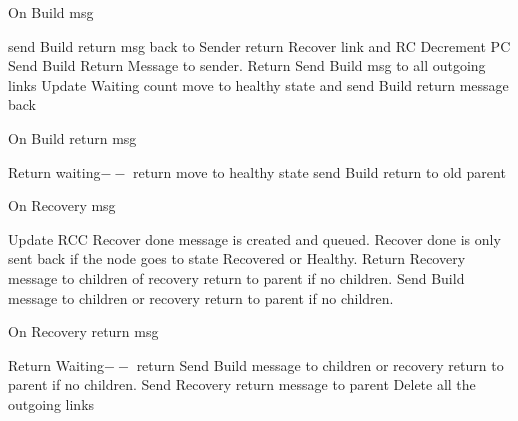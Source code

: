 \documentclass{article}
\begin{document}
	
\begin{algorithm}
\caption{On Build msg}
\label{Build message received}
\begin{algorithmic}[1]
\State send Build return msg back to Sender
\State return
\EndIf
\State Recover link and RC
\State Decrement PC
\State Send Build Return Message to sender.
\State Return
\EndIf
\State Send Build msg to all outgoing links
\State Update Waiting count
\State move to healthy state and send Build return message back
\EndIf
\EndProcedure
\end{algorithmic}
\end{algorithm}	



\begin{algorithm}
\caption{On Build return msg}
\label{Build return message received}
\begin{algorithmic}[1]
\State Return
\EndIf
\State waiting$--$
\State return
\EndIf
\State move to healthy state
\State send Build return to old parent
\EndIf
\EndProcedure
\end{algorithmic}
\end{algorithm}	


\begin{algorithm}
\caption{On Recovery msg}
\label{Recovery message received}
\begin{algorithmic}[1]
\State Update RCC
\State Recover done message is created and queued.
\State Recover done is only sent back if the node goes to state Recovered or Healthy.
\State Return
\EndIf
{}
\State Recovery message to children of recovery return to parent if no children.
\EndIf
{} 
\State Send Build message to children or recovery return to parent if no children.
\EndIf
\EndProcedure
\end{algorithmic}
\end{algorithm}	


\begin{algorithm}
\caption{On Recovery return msg}
\label{Recovery return message received}
\begin{algorithmic}[1]
\State Return
\EndIf
\State Waiting$--$
\State return
\EndIf
{}
\State Send Build message to children or recovery return to parent if no children.
\State Send Recovery return message to parent
\State Delete all the outgoing links
\EndIf
\EndProcedure
\end{algorithmic}
\end{algorithm}	
\end{document}

